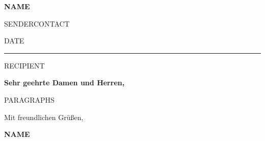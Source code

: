 \documentclass[11pt,a4paper]{article}
\begin{document}
\noindent
{\LARGE\bfseries\color{ink} {{NAME}}}\par
\vspace{0.1em}
{\small\color{ink} {{SENDERCONTACT}}}\par
\vspace{0.15em}
{\small\color{accent} {{DATE}}}\par
\vspace{0.4em}

\noindent
{\color{accent}\rule{\textwidth}{0.6pt}}\par
\vspace{0.8em}

\noindent
{{RECIPIENT}}

\vspace{1.6em}
\noindent
{\bfseries Sehr geehrte Damen und Herren,}\par

{{PARAGRAPHS}}

\vspace{1.4em}
\noindent
Mit freundlichen Gr\"u\ss{}en,
\vspace{2.2em}

\noindent
{\bfseries {{NAME}}}
\end{document}
